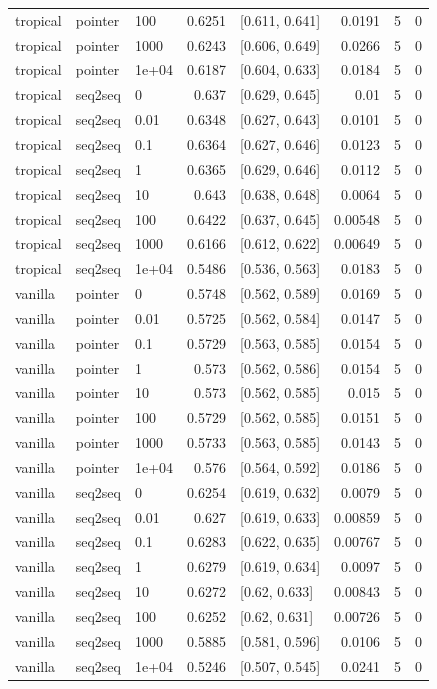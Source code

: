 \documentclass[10pt]{article}
\begin{document}
{\begin{longtable}{lllrlrrr}
tropical & pointer & 100 & 0.6251 & [0.611, 0.641] & 0.0191 & 5 & 0\\
tropical & pointer & 1000 & 0.6243 & [0.606, 0.649] & 0.0266 & 5 & 0\\
tropical & pointer & 1e+04 & 0.6187 & [0.604, 0.633] & 0.0184 & 5 & 0\\
tropical & seq2seq & 0 & 0.637 & [0.629, 0.645] & 0.01 & 5 & 0\\
tropical & seq2seq & 0.01 & 0.6348 & [0.627, 0.643] & 0.0101 & 5 & 0\\
tropical & seq2seq & 0.1 & 0.6364 & [0.627, 0.646] & 0.0123 & 5 & 0\\
tropical & seq2seq & 1 & 0.6365 & [0.629, 0.646] & 0.0112 & 5 & 0\\
tropical & seq2seq & 10 & 0.643 & [0.638, 0.648] & 0.0064 & 5 & 0\\
tropical & seq2seq & 100 & 0.6422 & [0.637, 0.645] & 0.00548 & 5 & 0\\
tropical & seq2seq & 1000 & 0.6166 & [0.612, 0.622] & 0.00649 & 5 & 0\\
tropical & seq2seq & 1e+04 & 0.5486 & [0.536, 0.563] & 0.0183 & 5 & 0\\
vanilla & pointer & 0 & 0.5748 & [0.562, 0.589] & 0.0169 & 5 & 0\\
vanilla & pointer & 0.01 & 0.5725 & [0.562, 0.584] & 0.0147 & 5 & 0\\
vanilla & pointer & 0.1 & 0.5729 & [0.563, 0.585] & 0.0154 & 5 & 0\\
vanilla & pointer & 1 & 0.573 & [0.562, 0.586] & 0.0154 & 5 & 0\\
vanilla & pointer & 10 & 0.573 & [0.562, 0.585] & 0.015 & 5 & 0\\
vanilla & pointer & 100 & 0.5729 & [0.562, 0.585] & 0.0151 & 5 & 0\\
vanilla & pointer & 1000 & 0.5733 & [0.563, 0.585] & 0.0143 & 5 & 0\\
vanilla & pointer & 1e+04 & 0.576 & [0.564, 0.592] & 0.0186 & 5 & 0\\
vanilla & seq2seq & 0 & 0.6254 & [0.619, 0.632] & 0.0079 & 5 & 0\\
vanilla & seq2seq & 0.01 & 0.627 & [0.619, 0.633] & 0.00859 & 5 & 0\\
vanilla & seq2seq & 0.1 & 0.6283 & [0.622, 0.635] & 0.00767 & 5 & 0\\
vanilla & seq2seq & 1 & 0.6279 & [0.619, 0.634] & 0.0097 & 5 & 0\\
vanilla & seq2seq & 10 & 0.6272 & [0.62, 0.633] & 0.00843 & 5 & 0\\
vanilla & seq2seq & 100 & 0.6252 & [0.62, 0.631] & 0.00726 & 5 & 0\\
vanilla & seq2seq & 1000 & 0.5885 & [0.581, 0.596] & 0.0106 & 5 & 0\\
vanilla & seq2seq & 1e+04 & 0.5246 & [0.507, 0.545] & 0.0241 & 5 & 0\\
\bottomrule
\end{longtable}
}
\end{document}
